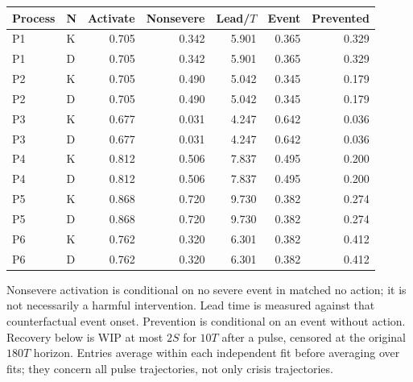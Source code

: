 \begin{center}\small\setlength{\tabcolsep}{4pt}\begin{tabular}{llrrrrr}\toprule

Process & N & Activate & Nonsevere & Lead/$T$ & Event & Prevented\\\midrule

P1 & K & 0.705 & 0.342 & 5.901 & 0.365 & 0.329\\

P1 & D & 0.705 & 0.342 & 5.901 & 0.365 & 0.329\\

P2 & K & 0.705 & 0.490 & 5.042 & 0.345 & 0.179\\

P2 & D & 0.705 & 0.490 & 5.042 & 0.345 & 0.179\\

P3 & K & 0.677 & 0.031 & 4.247 & 0.642 & 0.036\\

P3 & D & 0.677 & 0.031 & 4.247 & 0.642 & 0.036\\

P4 & K & 0.812 & 0.506 & 7.837 & 0.495 & 0.200\\

P4 & D & 0.812 & 0.506 & 7.837 & 0.495 & 0.200\\

P5 & K & 0.868 & 0.720 & 9.730 & 0.382 & 0.274\\

P5 & D & 0.868 & 0.720 & 9.730 & 0.382 & 0.274\\

P6 & K & 0.762 & 0.320 & 6.301 & 0.382 & 0.412\\

P6 & D & 0.762 & 0.320 & 6.301 & 0.382 & 0.412\\

\bottomrule\end{tabular}\end{center}

Nonsevere activation is conditional on no severe event in matched no action; it is not necessarily a harmful intervention. Lead time is measured against that counterfactual event onset. Prevention is conditional on an event without action. Recovery below is WIP at most $2S$ for $10T$ after a pulse, censored at the original $180T$ horizon. Entries average within each independent fit before averaging over fits; they concern all pulse trajectories, not only crisis trajectories.

